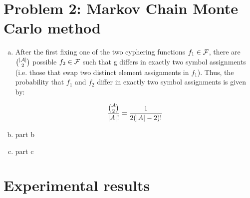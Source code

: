 \documentclass{siamart190516}
\begin{document}
\section*{Problem 2: Markov Chain Monte Carlo method}
\label{sec:mcmc}
\begin{enumerate}[(a)]
  \item After the first fixing one of the two cyphering functions $f_1 \in \mathcal{F}$, there are $\binom{\left| \mathcal{A} \right|}{2}$ possible $f_2 \in \mathcal{F}$ such that g differs in exactly two symbol assignments (i.e. those that swap two distinct element assignments in $f_1$). Thus, the probability that $f_1$ and $f_2$ differ in exactly two symbol assignments is given by:

        \[
          \frac{\binom{\mathcal{A}}{2}}{\left| A \right|!} = \frac{1}{2(\left| A \right| - 2)!}
        \]

  \item part b

  \item part c
\end{enumerate}

\section{Experimental results}
\label{sec:experiments}


% 
% 
\end{document}

